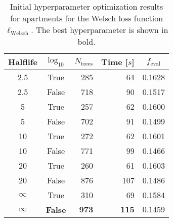 \begin{table}[h!]
  \begin{tabular}{@{}ccrrc@{}}
    Halflife & $\log_{10}$ & $N_\mathrm{trees}$ & Time [$s$] & $f_\mathrm{eval}$ \\
    \midrule
    \num{2.5} & True & \num{285} & \num{64} & \num{0.1628} \\
    \num{2.5} & False & \num{718} & \num{90} & \num{0.1517} \\
    \num{5} & True & \num{257} & \num{62} & \num{0.1600} \\
    \num{5} & False & \num{702} & \num{91} & \num{0.1499} \\
    \num{10} & True & \num{272} & \num{62} & \num{0.1601} \\
    \num{10} & False & \num{771} & \num{99} & \num{0.1466} \\
    \num{20} & True & \num{260} & \num{61} & \num{0.1603} \\
    \num{20} & False & \num{876} & \num{107} & \num{0.1486} \\
    $\infty$ & True & \num{310} & \num{69} & \num{0.1584} \\
    $\bm{\infty}$ & \textbf{False} & $\mathbf{973}$ & $\mathbf{115}$ & $\mathbf{0.1459}$ \\
  \end{tabular}
  \caption[Initial Hyperparameter Optimization Results for Apartments -- Welsch Loss Function]{\label{tab:h:HPO_initial_Welsch-ejerlejlighed-appendix}Initial hyperparameter optimization results for apartments for the Welsch loss function $\ell_\mathrm{Welsch}$. The best hyperparameter is shown in bold.}
\end{table}



